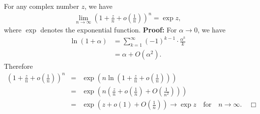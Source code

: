 \documentclass[12pt]{article}
\begin{document}
For any complex number $z$, we have
\begin{align*}
\lim\limits_{n\to\infty} \left(1+\frac{z}{n}+o\left(\frac{1}{n}\right)\right)^n=\exp{z},\end{align*} where $ \exp $ denotes the exponential function.
\newline
{\bf Proof:} 
For $\alpha\to 0$, we have 
\begin{align*} 
\ln(1+\alpha) &= \sum_{k=1}^\infty (-1)^{k-1}
\cdot\frac{\alpha^k}{k} \\
&= \alpha+O(\alpha^2). \end{align*}
Therefore 
\begin{eqnarray*}
\left(1+\frac{z}{n}+o\left(\frac{1}{n}\right)\right)^n &=& \exp\left(n\ln\left(1+\frac{z}{n}+o\left(\frac{1}{n}\right)\right)\right) \\
&=&\exp\left(n\left(\frac{z}{n}+o\left(\frac{1}{n}\right)+O(\frac{1}{n^2})\right)\right)\\
&=&\exp\left(z+o(1)+O(\frac{1}{n})\right)\to\exp{z} \quad \text{for} \quad n\to\infty. \quad \Box \end{eqnarray*}
\end{document}
